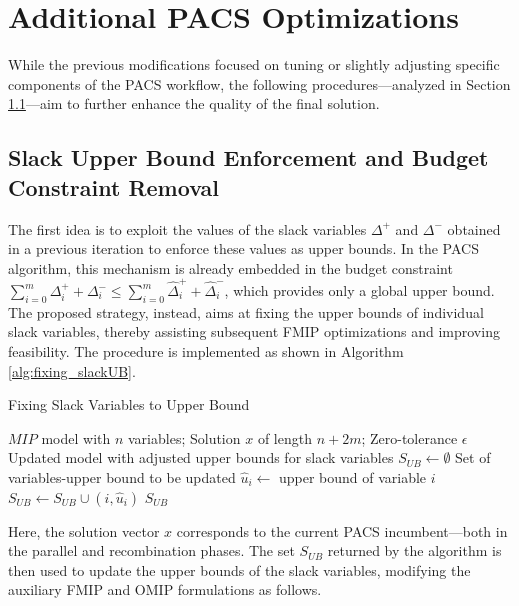 \section{Additional PACS Optimizations}
While the previous modifications focused on tuning or slightly adjusting specific components of the PACS workflow, the following procedures—analyzed in Section \ref{}—aim to further enhance the quality of the final solution.

\subsection{Slack Upper Bound Enforcement and Budget Constraint Removal}
The first idea is to exploit the values of the slack variables $\Delta^+$ and $\Delta^-$ obtained in a previous iteration to enforce these values as upper bounds.  
In the PACS algorithm, this mechanism is already embedded in the budget constraint $\sum_{i=0}^m \Delta_i^{+}+\Delta_i^{-} \le \sum_{i=0}^m \hat\Delta_i^{+}+\hat\Delta_i^{-}$, which provides only a global upper bound. The proposed strategy, instead, aims at fixing the upper bounds of individual slack variables, thereby assisting subsequent FMIP optimizations and improving feasibility.  
The procedure is implemented as shown in Algorithm \ref{alg:fixing_slackUB}.  
\begin{algorithm}[H]\label{alg:fixing_slackUB}
\caption{Fixing Slack Variables to Upper Bound}
\begin{algorithmic}[1]
\Require $MIP$ model with $n$ variables; Solution $x$ of length $n+2m$; Zero-tolerance $\epsilon$
\Ensure Updated model with adjusted upper bounds for slack variables
    \State $S_{UB} \gets \emptyset$ \Comment Set of variables-upper bound to be updated
        \State $\hat{u}_i \gets$ upper bound of variable $i$
            \State $S_{UB} \gets  S_{UB} \cup (i,\hat{u}_i)$
        \EndIf
    \EndFor
    \State \Return $S_{UB}$
\EndFunction
\end{algorithmic}
\end{algorithm}
Here, the solution vector $x$ corresponds to the current PACS incumbent---both in the parallel and recombination phases.  
The set $S_{UB}$ returned by the algorithm is then used to update the upper bounds of the slack variables, modifying the auxiliary FMIP and OMIP formulations as follows.  


